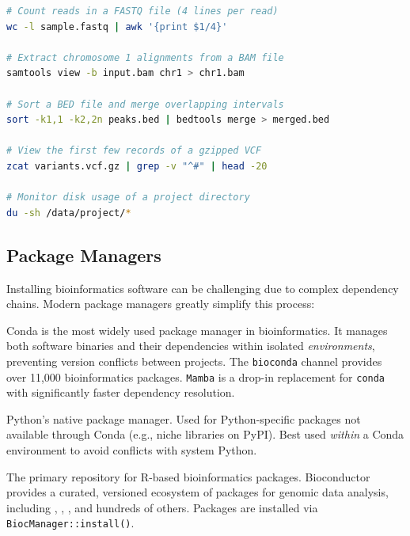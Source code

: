 \begin{lstlisting}[language=bash,caption={Essential Linux commands for bioinformatics.},label=lst:linux-basics]
# Count reads in a FASTQ file (4 lines per read)
wc -l sample.fastq | awk '{print $1/4}'

# Extract chromosome 1 alignments from a BAM file
samtools view -b input.bam chr1 > chr1.bam

# Sort a BED file and merge overlapping intervals
sort -k1,1 -k2,2n peaks.bed | bedtools merge > merged.bed

# View the first few records of a gzipped VCF
zcat variants.vcf.gz | grep -v "^#" | head -20

# Monitor disk usage of a project directory
du -sh /data/project/*
\end{lstlisting}

\subsection{Package Managers}
\label{subsec:bioinf:packagemanagers}

Installing bioinformatics software can be challenging due to complex dependency chains. Modern package managers greatly simplify this process:

\begin{description}[style=nextline, font=\bfseries, itemsep=4pt]
  \item[Conda / Mamba]
  Conda is the most widely used package manager in bioinformatics. It manages both software binaries and their dependencies within isolated \textit{environments}, preventing version conflicts between projects. The \texttt{bioconda} channel provides over 11,000 bioinformatics packages. \texttt{Mamba} is a drop-in replacement for \texttt{conda} with significantly faster dependency resolution.

  \item[Pip]
  Python's native package manager. Used for Python-specific packages not available through Conda (e.g., niche libraries on PyPI). Best used \textit{within} a Conda environment to avoid conflicts with system Python.

  \item[Bioconductor]
  The primary repository for R-based bioinformatics packages. Bioconductor provides a curated, versioned ecosystem of packages for genomic data analysis, including , , , and hundreds of others. Packages are installed via \texttt{BiocManager::install()}.
\end{description}

